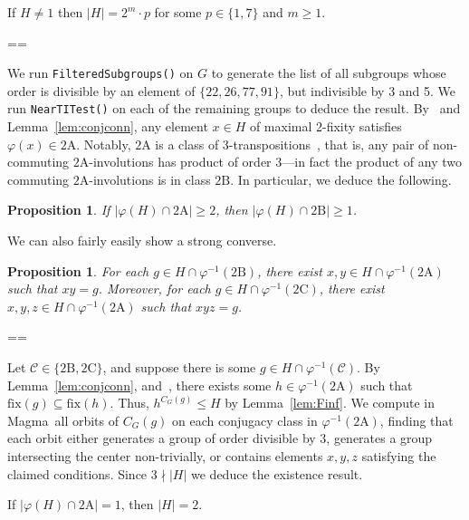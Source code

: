 \documentclass[11pt, a4paper]{amsart}
\makeatletter
\newcommand\fix{\mathrm{fix}}
\newcommand{\magma}{{\sc Magma}}
\newtheorem{prop}[thm]{Proposition}
\renewcommand{\proofname}{Proof}
\renewenvironment{proof}[1][\proofname]{\par
  \pushQED{\qed}  \normalfont \partopsep=\z@skip \topsep=\z@skip
  \trivlist
  \item[\hskip\labelsep
        \scshape
    #1\@addpunct{.}]\ignorespaces
}{  \popQED\endtrivlist\@endpefalse
}
\makeatother
\begin{document}
\begin{cor}\label{cor:orderformFi22}
    If $H\ne 1$ then $|H|=2^m\cdot p$ for some $p\in\{1,7\}$ and $m\geq 1$.\end{cor}
\begin{proof}
   We run {\tt{FilteredSubgroups()}} on $G$ to generate the list of all subgroups whose order is divisible by an element of $\{22,26,77,91\}$, but indivisible by 3 and 5. We run {\tt{NearTITest()}} on each of the remaining groups to deduce the result.
\end{proof}
By~\cite[Propositions 3.1, 3.2, 3.3, and Theorem 4.2]{CDP} and Lemma~\ref{lem:conjconn}, any element $x\in H$ of maximal 2-fixity satisfies $\varphi(x)\in\mathrm{2A}$. Notably, $\mathrm{2A}$ is a class of $3$-transpositions~\cite{atlas}, that is, any pair of non-commuting $\mathrm{2A}$-involutions has product of order 3---in fact the product of any two commuting $\mathrm{2A}$-involutions is in class $\mathrm{2B}$. In particular, we deduce the following.
\begin{prop}\label{prop:Fi22exist2B}
    If $|\varphi(H)\cap\mathrm{2A}|\geq 2$, then $|\varphi(H)\cap\mathrm{2B}|\geq1$.
\end{prop}
We can also fairly easily show a strong converse.
\begin{prop}\label{prop:fi222B2C}
    For each $g\in H\cap\varphi^{-1}(\mathrm{2B})$, there exist $x,y\in H\cap\varphi^{-1}(\mathrm{2A})$ such that $xy=g$. Moreover, for each $g\in H\cap\varphi^{-1}(\mathrm{2C})$, there exist $x,y,z\in H\cap\varphi^{-1}(\mathrm{2A})$ such that $xyz=g$.
\end{prop}
\begin{proof}
    Let $\mathcal{C}\in\{\mathrm{2B},\mathrm{2C}\}$, and suppose there is some $g\in H\cap \varphi^{-1}(\mathcal{C})$. By Lemma~\ref{lem:conjconn}, and~\cite[Theorems 1.1 and 4.2]{CDP}, there exists some $h\in\varphi^{-1}(\mathrm{2A})$ such that $\fix(g)\subseteq\fix(h)$. Thus, $h^{C_G(g)}\leq H$ by Lemma~\ref{lem:Finf}. We compute in \magma~all orbits of $C_G(g)$ on each conjugacy class in $\varphi^{-1}(\mathrm{2A})$, finding that each orbit either generates a group of order divisible by 3, generates a group intersecting the center non-trivially, or contains elements $x,y,z$ satisfying the claimed conditions. Since $3\nmid |H|$ we deduce the existence result.\end{proof}
\begin{cor}\label{cor:fi22unique2a}
    If $|\varphi(H) \cap \mathrm{2A}|=1$, then $|H|=2$.
\end{cor}
\end{document}
